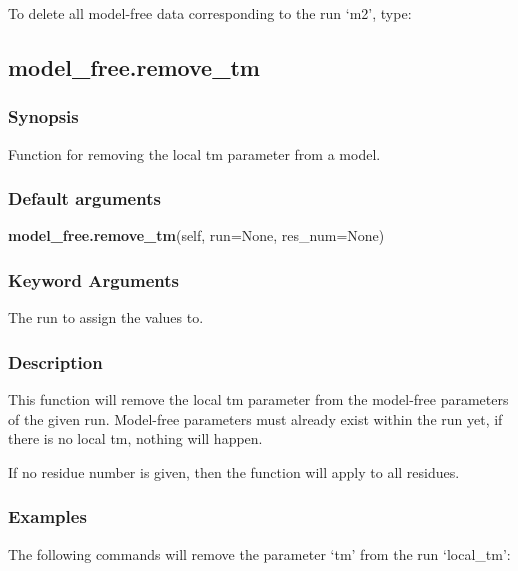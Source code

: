 To delete all model-free data corresponding to the run `m2', type:




\newpage

\subsection{model\_free.remove\_tm}


\subsubsection{Synopsis}

Function for removing the local tm parameter from a model.

\subsubsection{Default arguments}

\textsf{\textbf{model\_free.remove\_tm}(self, run=None, res\_num=None)}


\subsubsection{Keyword Arguments}

  The run to assign the values to.


\subsubsection{Description}

This function will remove the local tm parameter from the model-free parameters of the given
run.  Model-free parameters must already exist within the run yet, if there is no local tm,
nothing will happen.

If no residue number is given, then the function will apply to all residues.


\subsubsection{Examples}

The following commands will remove the parameter `tm' from the run `local\_tm':




